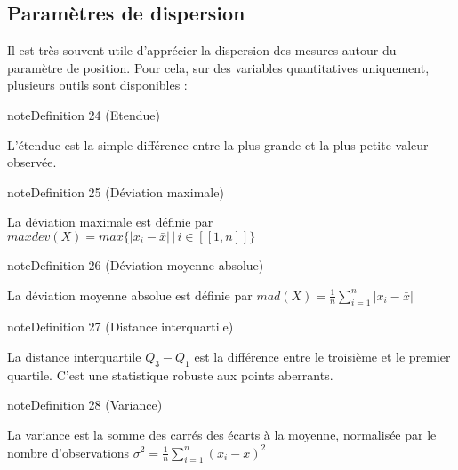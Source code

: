 \documentclass[letterpaper,10pt,english]{jupyterBook}
\begin{document}
\subsection{Paramètres de dispersion}
\label{\detokenize{statsdescriptives:parametres-de-dispersion}}
\sphinxAtStartPar
Il est très souvent utile d’apprécier la dispersion des mesures autour du paramètre de position. Pour cela, sur des variables quantitatives uniquement, plusieurs outils sont disponibles :
\label{statsdescriptives:definition-8}
\begin{sphinxadmonition}{note}{Definition 24 (Etendue)}



\sphinxAtStartPar
L’étendue est la simple différence entre la plus grande et la plus petite valeur observée.
\end{sphinxadmonition}
\label{statsdescriptives:definition-9}
\begin{sphinxadmonition}{note}{Definition 25 (Déviation maximale)}



\sphinxAtStartPar
La déviation maximale est définie par
\( maxdev(X) = max \{ |x_i - \bar{x}| \,|\, i\in[\![1,n]\!]\}\)
\end{sphinxadmonition}
\label{statsdescriptives:definition-10}
\begin{sphinxadmonition}{note}{Definition 26 (Déviation moyenne absolue)}



\sphinxAtStartPar
La déviation moyenne absolue est définie par
\( mad(X) = \frac{1}{n} \displaystyle\sum_{i=1}^n |x_i - \bar{x}|\)
\end{sphinxadmonition}
\label{statsdescriptives:definition-11}
\begin{sphinxadmonition}{note}{Definition 27 (Distance interquartile)}



\sphinxAtStartPar
La distance interquartile \(Q_3-Q_1\) est la différence entre le troisième et le premier quartile. C’est une statistique robuste aux points aberrants.
\end{sphinxadmonition}
\label{statsdescriptives:definition-12}
\begin{sphinxadmonition}{note}{Definition 28 (Variance)}



\sphinxAtStartPar
La variance est la somme des carrés des écarts à la moyenne, normalisée par le nombre d’observations
\(\sigma^2 = \frac{1}{n}\displaystyle\sum_{i=1}^n\left (x_i-\bar{x}\right )^2\)
\end{sphinxadmonition}
\end{document}
